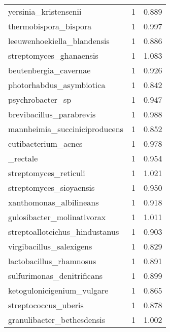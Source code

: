 \begin{tabular}{lrr}
                       yersinia\_kristensenii &                   1 &     0.889 \\
                       thermobispora\_bispora &                   1 &     0.997 \\
                 leeuwenhoekiella\_blandensis &                   1 &     0.886 \\
                     streptomyces\_ghanaensis &                   1 &     1.083 \\
                       beutenbergia\_cavernae &                   1 &     0.926 \\
                    photorhabdus\_asymbiotica &                   1 &     0.842 \\
                            psychrobacter\_sp &                   1 &     0.947 \\
                    brevibacillus\_parabrevis &                   1 &     0.988 \\
               mannheimia\_succiniciproducens &                   1 &     0.852 \\
                         cutibacterium\_acnes &                   1 &     0.978 \\
                       [eubacterium]\_rectale &                   1 &     0.954 \\
                       streptomyces\_reticuli &                   1 &     1.021 \\
                     streptomyces\_sioyaensis &                   1 &     0.950 \\
                     xanthomonas\_albilineans &                   1 &     0.918 \\
                  gulosibacter\_molinativorax &                   1 &     1.011 \\
              streptoalloteichus\_hindustanus &                   1 &     0.903 \\
                    virgibacillus\_salexigens &                   1 &     0.829 \\
                     lactobacillus\_rhamnosus &                   1 &     0.891 \\
                  sulfurimonas\_denitrificans &                   1 &     0.899 \\
                  ketogulonicigenium\_vulgare &                   1 &     0.865 \\
                        streptococcus\_uberis &                   1 &     0.878 \\
                  granulibacter\_bethesdensis &                   1 &     1.002 \\

\end{tabular}
